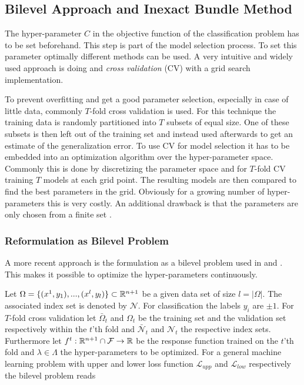 \subsection{Bilevel Approach and Inexact Bundle Method}

The hyper-parameter \(C\) in the objective function of the classification problem has to be set beforehand. This step is part of the model selection process.
To set this parameter optimally different methods can be used.
A very intuitive and widely used approach is doing  and \emph{cross validation} (CV) with a grid search implementation.

To prevent overfitting and get a good parameter selection, especially in case of little data, commonly \(T\)-fold cross validation is used.
For this technique the training data is randomly partitioned into \(T\) subsets of equal size. One of these subsets is then left out of the training set and instead used afterwards to get an estimate of the generalization error. 
To use CV for model selection it has to be embedded into an optimization algorithm over the hyper-parameter space. 
Commonly this is done by discretizing the parameter space and for \(T\)-fold CV training \(T\) models at each grid point. The resulting models are then compared to find the best parameters in the grid.
Obviously for a growing number of hyper-parameters this is very costly. An additional drawback is that the parameters are only chosen from a finite set \cite[p. 30]{Kunapuli2008}.

\subsubsection{Reformulation as Bilevel Problem}

A more recent approach is the formulation as a bilevel problem used in \cite{Kunapuli2008} and \cite{Moore2011}.
This makes it possible to optimize the hyper-parameters continuously.


Let \(\Omega = \{(x^1,y_1),...,(x^l,y_l)\} \subset \mathbb{R}^{n+1}\) be a given data set of size \(l = |\Omega|\). The associated index set is denoted by \(\mathcal{N}\). For classification the labels \(y_i\) are \(\pm1\).
For \(T\)-fold cross validation let \(\bar{\Omega}_t\) and \(\Omega_t\) be the training set and the validation set respectively within the \(t\)'th fold and \(\bar{\mathcal{N}}_t\) and \(\mathcal{N}_t\) the respective index sets.
Furthermore let \(f^t:\mathbb{R}^{n+1}\cap\mathcal{F} \to \mathbb{R}\) be the response function trained on the \(t\)'th fold and \(\lambda \in \Lambda\) the hyper-parameters to be optimized.
For a general machine learning problem with upper and lower loss function \(\mathcal{L}_{upp}\) and \(\mathcal{L}_{low}\) respectively the bilevel problem reads
 
